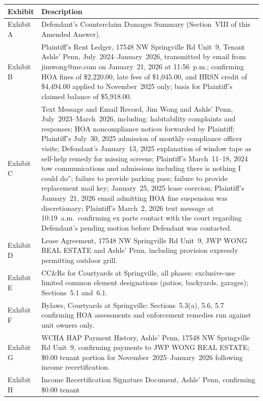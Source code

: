 \documentclass[10pt,letterpaper,oneside]{extarticle}
\begin{document}
\begin{longtable}{p{0.9in} p{4.7in}}
	\toprule
	\textbf{Exhibit} & \textbf{Description} \\
	\midrule
	\endhead
	Exhibit A & Defendant's Counterclaim Damages Summary
	(Section~VIII of this Amended Answer). \\[6pt]
	Exhibit B & Plaintiff's Rent Ledger, 17548 NW
	Springville Rd Unit~9, Tenant Ashle' Penn,
	July~2024--January~2026, transmitted by email from
	jimwong@me.com on January~21, 2026 at 11:56~p.m.;
	confirming HOA fines of \$2,220.00, late fees of
	\$1,045.00, and HRSN credit of \$4,494.00 applied
	to November~2025 only; basis for Plaintiff's claimed
	balance of \$5,918.00. \\[6pt]
	Exhibit C & Text Message and Email Record, Jim Wong
	and Ashle' Penn, July~2023--March~2026, including:
	habitability complaints and responses; HOA
	noncompliance notices forwarded by Plaintiff;
	Plaintiff's July~30, 2025 admission of monthly
	compliance officer visits; Defendant's January~13,
	2025 explanation of window tape as self-help remedy
	for missing screens; Plaintiff's March~11--18, 2024
	tow communications and admissions including there
	is nothing I could do''; failure to provide parking
	pass; failure to provide replacement mail key;
	January~25, 2025 lease coercion; Plaintiff's
	January~21, 2026 email admitting HOA fine suspension
	was discretionary; Plaintiff's March~2, 2026 text
	message at 10:19~a.m.\ confirming ex parte contact
	with the court regarding Defendant's pending motion
	before Defendant was contacted. \\[6pt]
	Exhibit D & Lease Agreement, 17548 NW Springville
	Rd Unit~9, JWP WONG REAL ESTATE and Ashle' Penn,
	including provision expressly permitting outdoor
	grill. \\[6pt]
	Exhibit E & CC\&Rs for Courtyards at Springville,
	all phases: exclusive-use limited common element
	designations (patios, backyards, garages);
	Sections~5.1 and~6.1. \\[6pt]
	Exhibit F & Bylaws, Courtyards at Springville:
	Sections~5.3(a), 5.6, 5.7 confirming HOA
	assessments and enforcement remedies run against
	unit owners only. \\[6pt]
	Exhibit G & WCHA HAP Payment History, Ashle' Penn,
	17548 NW Springville Rd Unit~9, confirming payments
	to JWP WONG REAL ESTATE; \$0.00 tenant portion for
	November~2025--January~2026 following income
	recertification. \\[6pt]
	Exhibit H & Income Recertification Signature
	Document, Ashle' Penn, confirming \$0.00 tenant

\end{longtable}
\end{document}
